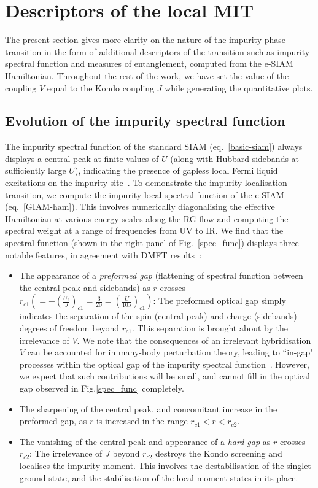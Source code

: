 \section{Descriptors of the local MIT}
\label{desc-mit}

The present section gives more clarity on the nature of the impurity phase transition in the form of additional descriptors of the transition such as impurity spectral function and measures of entanglement, computed from the e-SIAM Hamiltonian. Throughout the rest of the work, we have set the value of the coupling \(V\) equal to the Kondo coupling \(J\) while generating the quantitative plots.

\subsection{Evolution of the impurity spectral function}

The impurity spectral function of the standard SIAM (eq.~\eqref{basic-siam}) always displays a central peak at finite values of \(U\) (along with Hubbard sidebands at sufficiently large \(U\)), indicating the presence of gapless local Fermi liquid excitations on the impurity site~\cite{wilson1975,nozieres1974fermi,costi_hewson_1990}. To demonstrate the impurity localisation transition, we compute the impurity local spectral function of the e-SIAM (eq.~\eqref{GIAM-ham}). This involves numerically diagonalising the effective Hamiltonian at various energy scales along the RG flow and computing the spectral weight at a range of frequencies from UV to IR. We find that the spectral function (shown in the right panel of Fig.~\eqref{spec_func}) displays three notable features, in agreement with DMFT results~\cite{georges1996}:
\begin{itemize}
	\item The appearance of a {\it preformed gap} (flattening of spectral function between the central peak and sidebands) as \(r\) crosses \(r_{c1} \left(= -\left(\frac{U_b}{J}\right)_{c1} = \frac{3}{20} = \left(\frac{U}{10 J}\right)_{c1}\right)\): The preformed optical gap simply indicates the separation of the spin (central peak) and charge (sidebands) degrees of freedom beyond \(r_{c1}\). This separation is brought about by the irrelevance of \(V\). We note that the consequences of an irrelevant hybridisation \(V\) can be accounted for in many-body perturbation theory, leading to ``in-gap" processes within the optical gap of the impurity spectral function~\cite{nozieres_dmft}. However, we expect that such contributions will be small, and cannot fill in the optical gap observed in Fig.\ref{spec_func} completely.
	\item The sharpening of the central peak, and concomitant increase in the preformed gap, as $r$ is increased in the range $r_{c1} < r < r_{c2}$.
	\item The vanishing of the central peak and appearance of a {\it hard gap} as \(r\) crosses \(r_{c2}\): The irrelevance of \(J\) beyond \(r_{c2}\) destroys the Kondo screening and localises the impurity moment. This involves the destabilisation of the singlet ground state, and the stabilisation of the local moment states in its place.
\end{itemize}

